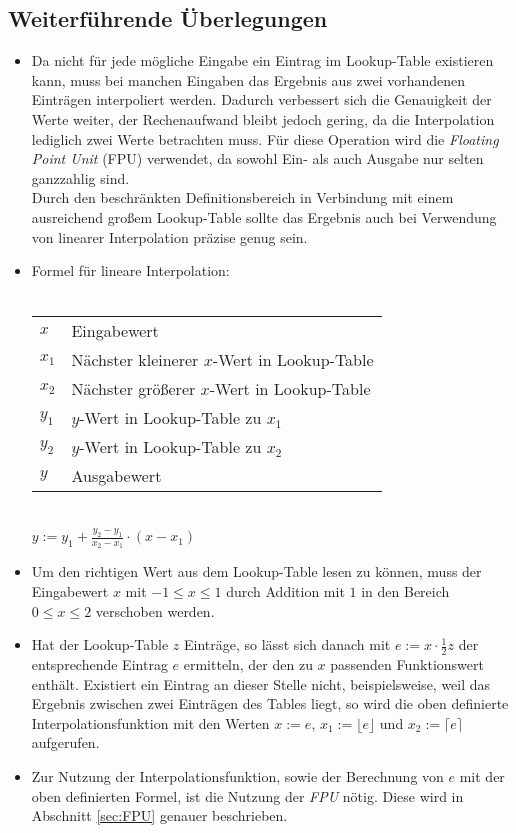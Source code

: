 \documentclass{article}
\begin{document}
	\subsection{Weiterführende Überlegungen}
		\begin{itemize}
			\item Da nicht für jede mögliche Eingabe ein Eintrag im Lookup-Table existieren kann, muss bei manchen Eingaben das Ergebnis aus zwei vorhandenen Einträgen interpoliert werden. Dadurch verbessert sich die Genauigkeit der Werte weiter, der Rechenaufwand bleibt jedoch gering, da die Interpolation lediglich zwei Werte betrachten muss. Für diese Operation wird die \emph{Floating Point Unit} (FPU) verwendet, da sowohl Ein- als auch Ausgabe nur selten ganzzahlig sind.\\
			Durch den beschränkten Definitionsbereich in Verbindung mit einem ausreichend großem Lookup-Table sollte das Ergebnis auch bei Verwendung von linearer Interpolation präzise genug sein.

			\item Formel für lineare Interpolation:\\
				\\
				\begin{tabular}{l | l}
					$x$ & Eingabewert \\
					$x_1$ & Nächster kleinerer $x$-Wert in Lookup-Table \\
					$x_2$ & Nächster größerer $x$-Wert in Lookup-Table\\
					$y_1$ & $y$-Wert in Lookup-Table zu $x_1$ \\
					$y_2$ & $y$-Wert in Lookup-Table zu $x_2$ \\
					$y$ & Ausgabewert \\
				\end{tabular}\\

				$ y := y_1 + \frac{y_2-y_1}{x_2-x_1} \cdot (x - x_1) $

			\item Um den richtigen Wert aus dem Lookup-Table lesen zu können, muss der Eingabewert $x$ mit $-1 \leq x \leq 1$ durch Addition mit $1$ in den Bereich $0 \leq x \leq 2$ verschoben werden.

			\item Hat der Lookup-Table $z$ Einträge, so lässt sich danach mit $e := x \cdot \frac{1}{2} z$ der entsprechende Eintrag $e$ ermitteln, der den zu $x$ passenden Funktionswert enthält. Existiert ein Eintrag an dieser Stelle nicht, beispielsweise, weil das Ergebnis zwischen zwei Einträgen des Tables liegt, so wird die oben definierte Interpolationsfunktion mit den Werten $x := e$, $x_1 := \lfloor e \rfloor$ und $x_2 := \lceil e \rceil$ aufgerufen.

			\item Zur Nutzung der Interpolationsfunktion, sowie der Berechnung von $e$ mit der oben definierten Formel, ist die Nutzung der \emph{FPU} nötig. Diese wird in Abschnitt \ref{sec:FPU} genauer beschrieben.
		\end{itemize}
\end{document}
